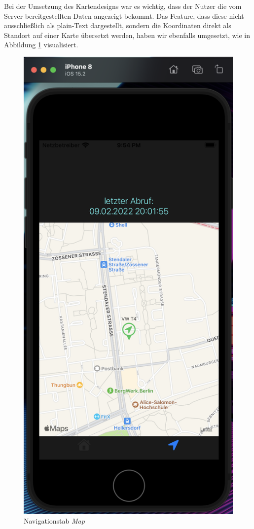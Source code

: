 Bei der Umsetzung  des Kartendesigns war es wichtig, dass der Nutzer die vom Server bereitgestellten Daten angezeigt bekommt. Das  Feature, dass diese nicht ausschließlich als plain-Text dargestellt, sondern die Koordinaten direkt als Standort auf einer Karte übersetzt werden, haben wir ebenfalls umgesetzt, wie in Abbildung \ref{Map} visualisiert.
\begin{figure} [H]
	\begin{center}
		\includegraphics[width=1\textwidth]{Bilder/iOS_map.png}
		\caption{Navigationstab \textit{Map}}
		\label{Map}
	\end{center}
\end{figure}
